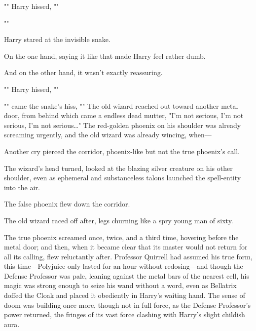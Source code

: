 "" Harry hissed, ""

""

Harry stared at the invisible snake.

On the one hand, saying it like that made Harry feel rather dumb.

And on the other hand, it wasn't exactly reassuring.

"" Harry hissed, ""

"" came the snake's hiss, ""
\later
The old wizard reached out toward another metal door, from behind which came a
endless dead mutter, "I'm not serious, I'm not serious, I'm not
serious{\ldots}" The red-golden phoenix on his shoulder was already screaming
urgently, and the old wizard was already wincing, when---

Another cry pierced the corridor, phoenix-like but not the true phoenix's call.

The wizard's head turned, looked at the blazing silver creature on his other
shoulder, even as ephemeral and substanceless talons launched the spell-entity
into the air.

The false phoenix flew down the corridor.

The old wizard raced off after, legs churning like a spry young man of sixty.

The true phoenix screamed once, twice, and a third time, hovering before the
metal door; and then, when it became clear that its master would not return for
all its calling, flew reluctantly after.
\later
Professor Quirrell had assumed his true form, this time---Polyjuice only lasted
for an hour without redosing---and though the Defense Professor was pale,
leaning against the metal bars of the nearest cell, his magic was strong enough
to seize his wand without a word, even as Bellatrix doffed the Cloak and placed
it obediently in Harry's waiting hand. The sense of doom was building once
more, though not in full force, as the Defense Professor's power returned, the
fringes of its vast force clashing with Harry's slight childish aura.

